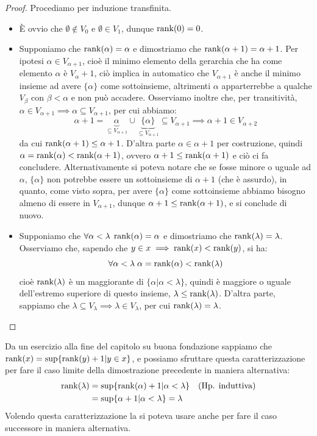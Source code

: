 \begin{proof}
	Procediamo per induzione transfinita.
	\begin{itemize}
		\item[$\boxed{\text{caso 0}}$] \`E ovvio che $\emptyset \not \in V_0$ e $\emptyset \in V_1$, dunque $\operatorname{rank}(0) = 0$.
		\item[$\boxed{\text{caso successore}}$] Supponiamo che $\operatorname{rank}(\alpha) = \alpha$ e dimostriamo che $\operatorname{rank}(\alpha + 1) = \alpha + 1$. Per ipotesi $\alpha \in V_{\alpha + 1}$, cio\`e il minimo elemento della gerarchia che ha come elemento $\alpha$ \`e $V_\alpha + 1$,
		ci\`o implica in automatico che $V_{\alpha + 1}$ \`e anche il minimo insieme ad avere $\{\alpha\}$ come sottoinsieme, altrimenti $\alpha$ apparterrebbe a qualche $V_\beta$ con $\beta < \alpha$ e non pu\`o accadere. Osserviamo inoltre che, per transitivit\`a, $\alpha \in V_{\alpha + 1} \implies \alpha \subseteq V_{\alpha + 1}$, per cui abbiamo:
		\[ \alpha + 1 = \underbrace{\alpha}_{\subseteq V_{\alpha + 1}} \cup \underbrace{\{\alpha\}}_{\subseteq V_{\alpha + 1}} \subseteq V_{\alpha + 1} \implies \alpha + 1 \in V_{\alpha + 2}
			\]
		da cui $\operatorname{rank}(\alpha + 1) \leq \alpha + 1$. D'altra parte $\alpha \in \alpha + 1$ per costruzione, quindi $\alpha = \operatorname{rank}(\alpha) < \operatorname{rank}(\alpha + 1)$, ovvero $\alpha + 1 \leq \operatorname{rank}(\alpha + 1)$ e ci\`o ci fa concludere. Alternativamente si poteva notare che se fosse minore o uguale ad $\alpha$, $\{\alpha\}$
		non potrebbe essere un sottoinsieme di $\alpha + 1$ (che \`e assurdo), in quanto, come visto sopra, per avere $\{\alpha\}$ come sottoinsieme abbiamo bisogno almeno di essere in $V_{\alpha + 1}$, dunque $\alpha + 1 \leq \operatorname{rank}(\alpha + 1)$, e si conclude di nuovo. 
		\item[$\boxed{\text{caso limite}}$] Supponiamo che $\forall \alpha < \lambda \; \operatorname{rank}(\alpha) = \alpha$ e dimostriamo che $\operatorname{rank}(\lambda) = \lambda$. Osserviamo che, sapendo che $y \in x \implies \operatorname{rank}(x) < \operatorname{rank}(y)$, si ha:
		\[ \forall \alpha < \lambda \; \alpha = \operatorname{rank}(\alpha) < \operatorname{rank}(\lambda)
			\]
		cio\`e $\operatorname{rank}(\lambda)$ \`e un maggiorante di $\{\alpha | \alpha < \lambda\}$, quindi \`e maggiore o uguale dell'estremo superiore di questo insieme, $\lambda \leq \operatorname{rank}(\lambda)$. D'altra parte, sappiamo che $\lambda \subseteq V_{\lambda} \implies \lambda \in V_\lambda$, per cui $\operatorname{rank}(\lambda) = \lambda$.
	\end{itemize}
\end{proof}

\begin{remark}
	Da un esercizio alla fine del capitolo su buona fondazione sappiamo che $\operatorname{rank}(x) = \sup\{\operatorname{rank}(y) + 1 | y \in x\}$, e possiamo sfruttare questa caratterizzazione per fare il caso limite della dimostrazione precedente in maniera alternativa:
	\begin{align*}
		\operatorname{rank}(\lambda) &= \sup\{\operatorname{rank}(\alpha) + 1 | \alpha < \lambda\} &&\text{(Hp. induttiva)}\\
					   &= \sup\{\alpha + 1 | \alpha < \lambda\} = \lambda
	\end{align*}
	Volendo questa caratterizzazione la si poteva usare anche per fare il caso successore in maniera alternativa.
\end{remark}

